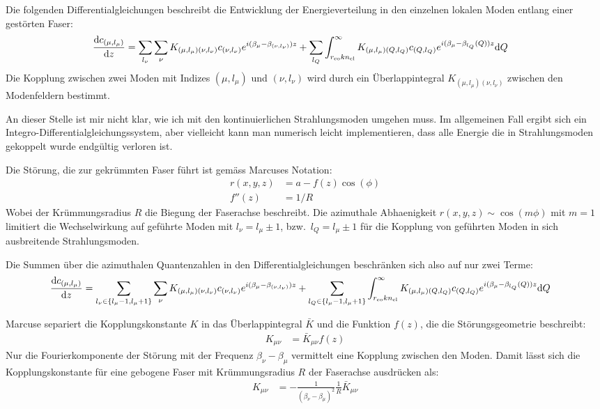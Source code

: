 \documentclass{article}
\def\drm{\textrm d}
\newcommand{\rco}{r_\textrm{co}}
\newcommand{\ncl}{n_\textrm{cl}}
\begin{document}
Die folgenden Differentialgleichungen beschreibt die Entwicklung der
Energieverteilung in den einzelnen lokalen Moden entlang einer
gest\"orten Faser:
\begin{align}
  \frac{\drm c_{(\mu,l_\mu)}}{\drm z} &= 
  \sum_{l_\nu} \sum_\nu  K_{(\mu,l_\mu)(\nu,l_\nu)} c_{(\nu,l_\nu)} e^{i(\beta_\mu-\beta_{(\nu,l_\nu)})z} + 
  \sum_{l_Q} \int_{\rco k \ncl}^\infty  K_{(\mu,l_\mu)(Q,l_Q)} c_{(Q,l_Q)} e^{i(\beta_\mu-\beta_{l_Q}(Q))z} \drm Q
\end{align}
Die Kopplung zwischen zwei Moden mit Indizes $(\mu,l_\mu)$ und
$(\nu,l_\nu)$ wird durch ein \"Uberlappintegral
$K_{(\mu,l_\mu)(\nu,l_\nu)}$ zwischen den Modenfeldern bestimmt. 

An dieser Stelle ist mir nicht klar, wie ich mit den kontinuierlichen
Strahlungsmoden umgehen muss. Im allgemeinen Fall ergibt sich ein
Integro-Differentialgleichungssystem, aber vielleicht kann man
numerisch leicht implementieren, dass alle Energie die in
Strahlungsmoden gekoppelt wurde endg\"ultig verloren ist.


Die St\"orung, die zur gekr\"ummten Faser f\"uhrt ist gem\"ass
Marcuses Notation:
\begin{align}
  r(x,y,z)&=a-f(z)\cos(\phi)\\
  f''(z) &= 1/R
\end{align}
Wobei der Kr\"ummungsradius $R$ die Biegung der Faserachse
beschreibt. Die azimuthale Abhaenigkeit $r(x,y,z)\sim \cos(m\phi)$ mit
$m=1$ limitiert die Wechselwirkung auf gef\"uhrte Moden mit
$l_\nu=l_\mu\pm 1$, bzw.\ $l_Q=l_\mu\pm 1$ f\"ur die Kopplung von
gef\"uhrten Moden in sich ausbreitende Strahlungsmoden.

Die Summen \"uber die azimuthalen Quantenzahlen in den
Differentialgleichungen beschr\"anken sich also auf nur zwei Terme:
\begin{align}
  \label{eq:coupled-modes}
  \frac{\drm c_{(\mu,l_\mu)}}{\drm z} &= 
  \sum_{l_\nu\in\{l_\mu-1,l_\mu+1\}} \sum_\nu  K_{(\mu,l_\mu)(\nu,l_\nu)} c_{(\nu,l_\nu)} e^{i(\beta_\mu-\beta_{(\nu,l_\nu)})z} + 
  \sum_{l_Q\in\{l_\mu-1,l_\mu+1\}} \int_{\rco k \ncl}^\infty  K_{(\mu,l_\mu)(Q,l_Q)} c_{(Q,l_Q)} e^{i(\beta_\mu-\beta_{l_Q}(Q))z} \drm Q
\end{align}

Marcuse separiert die Kopplungskonstante $K$ in das \"Uberlappintegral
$\bar K$ und die Funktion $f(z)$, die die St\"orungsgeometrie
beschreibt:
\begin{align}
  K_{\mu \nu} &= \bar K_{\mu \nu} f(z) 
\end{align}
Nur die Fourierkomponente der St\"orung mit der Frequenz
$\beta_\nu-\beta_\mu$ vermittelt eine Kopplung zwischen den
Moden. Damit l\"asst sich die Kopplungskonstante f\"ur eine gebogene
Faser mit Kr\"ummungsradius $R$ der Faserachse ausdr\"ucken als:
\begin{align}
  K_{\mu \nu} &=  -\frac{1}{(\beta_\nu -\beta_\mu)^2} \frac{1}{R} \bar K_{\mu \nu} 
\end{align}
\end{document}
